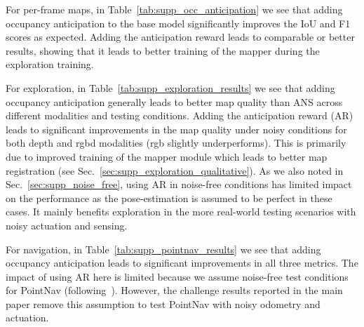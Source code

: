 \documentclass[runningheads]{llncs}
\begin{document}
For per-frame maps, in Table~\ref{tab:supp_occ_anticipation} we see that adding occupancy anticipation to the base model significantly improves the IoU and F1 scores as expected. Adding the anticipation reward leads to comparable or better results, showing that it leads to better training of the mapper during the exploration training.


For exploration, in Table~\ref{tab:supp_exploration_results} we see that adding occupancy anticipation generally leads to better map quality than ANS across different modalities and testing conditions. Adding the anticipation reward (AR) leads to significant improvements in the map quality under noisy conditions for both depth and rgbd modalities (rgb slightly underperforms). This is primarily due to improved training of the mapper module which leads to better map registration (see Sec.~\ref{sec:supp_exploration_qualitative}). As we also noted in Sec.~\ref{sec:supp_noise_free}, using AR in noise-free conditions has limited impact on the performance as the pose-estimation is assumed to be perfect in these cases. It mainly benefits exploration in the more real-world testing scenarios with noisy actuation and sensing. 


For navigation, in Table~\ref{tab:supp_pointnav_results} we see that adding occupancy anticipation leads to significant improvements in all three metrics. The impact of using AR here is limited because we assume noise-free test conditions for PointNav (following~\cite{habitat19iccv,chaplot2020learning}). However, the challenge results reported in the main paper remove this assumption to test PointNav with noisy odometry and actuation.
\end{document}
